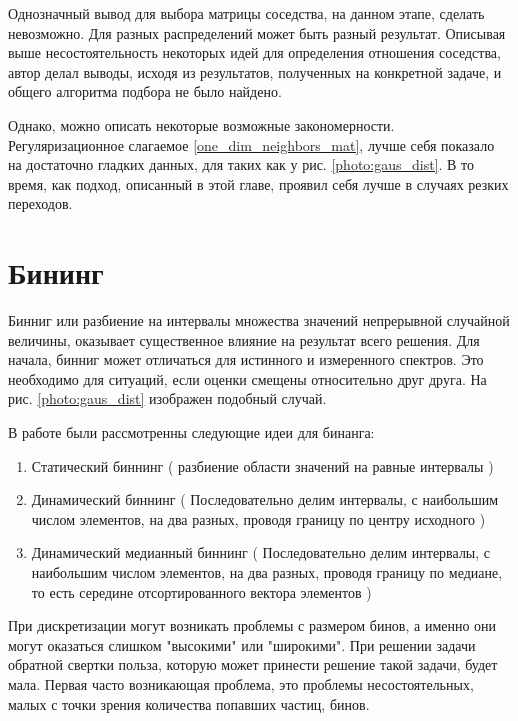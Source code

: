 \documentclass[a4paper,12pt]{diplom}
\begin{document}
Однозначный вывод для выбора матрицы соседства, на данном этапе, сделать невозможно. Для разных распределений может быть разный результат. 
Описывая выше несостоятельность некоторых идей для определения отношения соседства, автор делал выводы, исходя из результатов, полученных на 
конкретной задаче, и общего алгоритма подбора не было найдено.

Однако, можно описать некоторые возможные закономерности. Регуляризационное слагаемое \eqref{one_dim_neighbors_mat}, лучше себя показало на 
достаточно гладких данных, для таких как у рис. \ref{photo:gaus_dist}. В то время, как подход, описанный в этой главе, проявил себя лучше в 
случаях резких переходов.


\chapter{Бининг}

Бинниг или разбиение на интервалы множества значений непрерывной случайной величины, оказывает существенное влияние на результат всего решения.
Для начала, бинниг может отличаться для истинного и измеренного спектров. Это необходимо для ситуаций, если оценки смещены относительно друг друга. 
На рис. \ref{photo:gaus_dist} изображен подобный случай.

В работе были рассмотренны следующие идеи для бинанга:

\begin{enumerate}
   \item Статический биннинг ( разбиение области значений на равные интервалы ) \\
   
   \item Динамический биннинг ( Последовательно делим интервалы, с наибольшим числом элементов, 
   на два разных, проводя границу по центру исходного ) \\

   \item Динамический медианный биннинг ( Последовательно делим интервалы, с наибольшим числом элементов, 
   на два разных, проводя границу по медиане, то есть середине отсортированного вектора элементов )
\end{enumerate}


При дискретизации могут возникать проблемы с размером бинов, а именно они могут оказаться слишком "высокими" или "широкими". При решении задачи 
обратной свертки польза, которую может принести решение такой задачи, будет мала. Первая часто возникающая проблема, это проблемы несостоятельных,
малых с точки зрения количества попавших частиц, бинов. 
\end{document}
